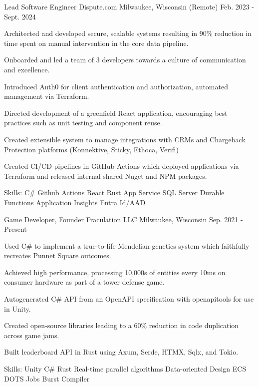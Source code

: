 \begin{cventries}
  \cventry
    {Lead Software Engineer} %
    {Dispute.com} %
    {Milwaukee, Wisconsin (Remote)} %
    {Feb. 2023 - Sept. 2024} %
    {
      \begin{cvitems} %
        \item {Architected and developed secure, scalable systems resulting in 90\% reduction in time spent on 
                manual intervention in the core data pipeline.}
        \item {Onboarded and led a team of 3 developers towards a culture of communication and excellence.}
        \item {Introduced Auth0 for client authentication and authorization, automated management via Terraform.}
        \item {Directed development of a greenfield React application, encouraging best practices such as unit testing and component reuse.}
        \item {Created extensible system to manage integrations with CRMs and Chargeback Protection platforms (Konnektive, Sticky, Ethoca, Verifi)}
        \item {Created CI/CD pipelines in GitHub Actions which deployed applications via Terraform and released internal shared Nuget and NPM packages.}
        \item {Skills: C\# \textbullet{} Github Actions \textbullet{} React \textbullet{} Rust \textbullet{} App Service \textbullet{} SQL Server \textbullet{} Durable Functions \textbullet{} Application Insights \textbullet{} Entra Id/AAD}
      \end{cvitems}
    }

  \cventry
    {Game Developer, Founder} %
    {Fraculation LLC} %
    {Milwaukee, Wisconsin} %
    {Sep. 2021 - Present} %
    {
      \begin{cvitems} %
        \item {Used C\# to implement a true-to-life Mendelian genetics system which faithfully recreates Punnet Square outcomes.}
        \item {Achieved high performance, processing 10,000s of entities every 10ms on consumer hardware as part of a tower defense game.}
        \item {Autogenerated C\# API from an OpenAPI specification with openapitools for use in Unity.}
        \item {Created open-source libraries leading to a 60\% reduction in code duplication across game jams.}
        \item {Built leaderboard API in Rust using Axum, Serde, HTMX, Sqlx, and Tokio.}
        \item {Skills: Unity \textbullet{} C\# \textbullet{} Rust \textbullet{} Real-time parallel algorithms \textbullet{} Data-oriented Design \textbullet{} ECS \textbullet{} DOTS \textbullet{} Jobs \textbullet{} Burst Compiler}
      \end{cvitems}
    }


\end{cventries}
